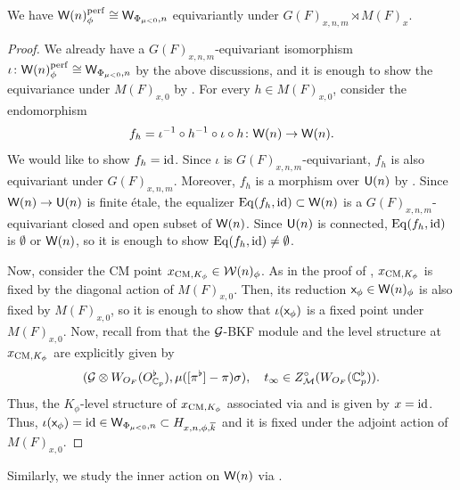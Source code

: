 \documentclass[12pt,reqno]{amsart}
\begin{document}
\begin{prop} \label{prop:equivariance_under_HW_even}
    We have ${\mathsf{W}}(n)_\phi^{\operatorname{perf}} \cong {\mathsf{W}}_{\Phi_{\mu < 0}, n}$ equivariantly under $G(F)_{x, n, m} \rtimes M(F)_x$. 
\end{prop}
\begin{proof}
    We already have a $G(F)_{x, n, m}$-equivariant isomorphism $\iota \colon {\mathsf{W}}(n)_\phi^{\operatorname{perf}} \cong {\mathsf{W}}_{\Phi_{\mu < 0}, n}$ by the above discussions, and it is enough to show the equivariance under $M(F)_{x, 0}$ by . For every $h \in M(F)_{x, 0}$, consider the endomorphism 
    \[
        f_h = \iota^{-1} \circ h^{-1} \circ \iota \circ h \colon {\mathsf{W}}(n) \to {\mathsf{W}}(n). 
    \]
    We would like to show $f_h = {\operatorname{id}}$. Since $\iota$ is $G(F)_{x, n, m}$-equivariant, $f_h$ is also equivariant under $G(F)_{x, n, m}$. Moreover, $f_h$ is a morphism over ${\mathsf{U}}(n)$ by . Since ${\mathsf{W}}(n) \to {\mathsf{U}}(n)$ is finite \'{e}tale, the equalizer ${\operatorname{Eq}}(f_h, {\operatorname{id}}) \subset {\mathsf{W}}(n)$ is a $G(F)_{x, n, m}$-equivariant closed and open subset of ${\mathsf{W}}(n)$. Since ${\mathsf{U}}(n)$ is connected, ${\operatorname{Eq}}(f_h, {\operatorname{id}})$ is $\emptyset$ or ${\mathsf{W}}(n)$, so it is enough to show ${\operatorname{Eq}}(f_h, {\operatorname{id}}) \neq \emptyset$. 

    Now, consider the CM point $x_{{\operatorname{CM}}, K_\phi} \in {\mathcal{W}}(n)_\phi$. As in the proof of , $x_{{\operatorname{CM}}, K_\phi}$ is fixed by the diagonal action of $M(F)_{x, 0}$. Then, its reduction ${\mathsf{x}}_\phi \in {\mathsf{W}}(n)_\phi$ is also fixed by $M(F)_{x, 0}$, so it is enough to show that $\iota({\mathsf{x}}_\phi)$ is a fixed point under $M(F)_{x, 0}$. %
    Now, recall from  that the ${\mathcal{G}}$-BKF module and the level structure at $x_{{\operatorname{CM}}, K_\phi}$ are explicitly given by 
    \[
        ({\mathcal{G}} \otimes W_{O_F}(O_{\mathbb{C}_p}^\flat), \mu([\pi^\flat] - \pi) \sigma) ,\quad t_\infty \in Z_{{\mathcal{M}}}^\circ(W_{O_F}(\mathbb{C}_p^\flat)). 
    \]
    Thus, the $K_\phi$-level structure of $x_{{\operatorname{CM}}, K_\phi}$ associated via  and  is given by $x = {\operatorname{id}}$. Thus, $\iota({\mathsf{x}}_\phi) = {\operatorname{id}} \in {\mathsf{W}}_{\Phi_{\mu < 0}, n} \subset H_{x, n, \phi, {\overline{k}}}$ and it is fixed under the adjoint action of $M(F)_{x, 0}$. 
\end{proof}

Similarly, we study the inner action on ${\mathsf{W}}(n)$ via . 
\end{document}
